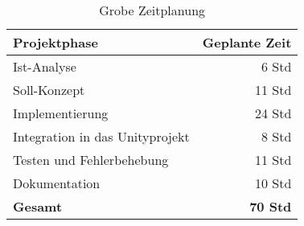 \begin{table}[h]
\centering
\begin{tabular}{lr}
\rowcolor{ckcGreen}\textbf{Projektphase} & \textbf{Geplante Zeit}\\
\hline
Ist-Analyse & 6 Std\\
\rowcolor{odd}Soll-Konzept & 11 Std\\
Implementierung & 24 Std\\
\rowcolor{odd}Integration in das Unityprojekt &  8 Std\\
Testen und Fehlerbehebung & 11 Std\\
\rowcolor{odd}Dokumentation & 10 Std\\
\hline
\hline
\rowcolor{ckcGreen}\textbf{Gesamt} & \textbf{70 Std}\\
\end{tabular}
\caption{Grobe Zeitplanung}
\label{tab:Zeit}
\end{table}